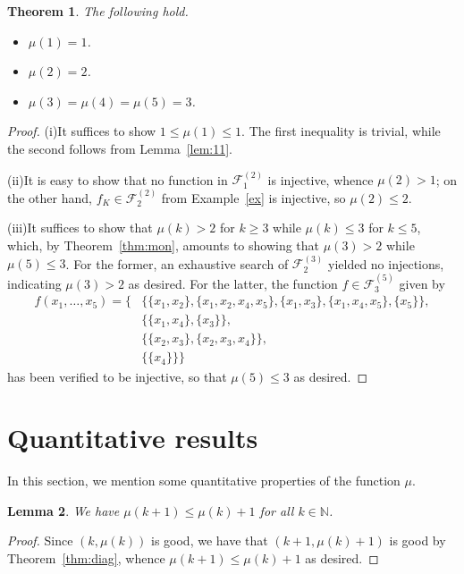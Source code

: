 \documentclass[a4paper,12pt]{article}
\newtheorem{theorem}{Theorem}[section]
\newtheorem{lemma}[theorem]{Lemma}
\theoremstyle{definition}
\theoremstyle{remark}
\newcommand{\fset}[2]{\mathcal F^{(#1)}_{#2}}
\newcommand{\N}{\mathbb N}
\begin{document}
\begin{theorem}
    The following hold.
    \begin{itemize}
        \item[\textnormal{(i)}] $\mu(1) = 1$.
        \item[\textnormal{(ii)}] $\mu(2) = 2$.
        \item[\textnormal{(iii)}] $\mu(3) = \mu(4) = \mu(5) = 3$.
    \end{itemize}
\end{theorem}
\begin{proof}
    (i)\enspace It suffices to show $1 \leq \mu(1) \leq 1$. The first inequality is trivial, while the second follows from Lemma~\ref{lem:11}.

    (ii)\enspace It is easy to show that no function in $\fset 21$ is injective, whence $\mu(2) > 1$; on the other hand, $f_K \in \fset 22$ from Example~\ref{ex} is injective, so $\mu(2) \leq 2$.

    (iii)\enspace It suffices to show that $\mu(k) > 2$ for $k \geq 3$ while $\mu(k) \leq 3$ for $k \leq 5$, which, by Theorem~\ref{thm:mon}, amounts to showing that $\mu(3) > 2$ while $\mu(5) \leq 3$. For the former, an exhaustive search of $\fset 32$ yielded no injections, indicating $\mu(3) > 2$ as desired. For the latter, the function $f \in \fset 53$ given by
    \begin{align*}
        f(x_1, \dots, x_5) = \Big\{&\{\{x_1, x_2\}, \{x_1, x_2, x_4, x_5\}, \{x_1, x_3\}, \{x_1, x_4, x_5\}, \{x_5\}\},\\
        &\{\{x_1, x_4\}, \{x_3\}\},\phantom{\Big\}}\\
        &\{\{x_2, x_3\}, \{x_2, x_3, x_4\}\},\phantom{\Big\}}\\
        &\{\{x_4\}\}\Big\}
    \end{align*}
    has been verified to be injective, so that $\mu(5) \leq 3$ as desired.
\end{proof}

\section{Quantitative results}\label{sec:qt}

In this section, we mention some quantitative properties of the function $\mu$.

\begin{lemma}
    We have $\mu(k+1) \leq \mu(k)+1$ for all $k \in \N$.
\end{lemma}
\begin{proof}
    Since $(k, \mu(k))$ is good, we have that $(k+1, \mu(k)+1)$ is good by Theorem~\ref{thm:diag}, whence $\mu(k+1) \leq \mu(k)+1$ as desired.
\end{proof}
\end{document}
